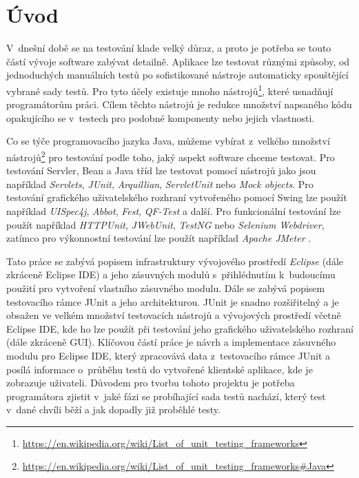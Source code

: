\chapter{Úvod}                                                            %
V~dnešní době se na testování klade velký důraz, a proto je potřeba se touto částí vývoje software zabývat detailně. Aplikace lze testovat různými způsoby, od jednoduchých manuálních testů po sofistikované nástroje automaticky spouštějící vybrané sady testů. Pro tyto účely existuje mnoho nástrojů\footnote{\url{https://en.wikipedia.org/wiki/List_of_unit_testing_frameworks}}, které usnadňují programátorům práci. Cílem těchto nástrojů je redukce množství napsaného kódu opakujícího se v~testech pro podobné komponenty nebo jejich vlastnosti.

Co se týče programovacího jazyka Java, můžeme vybírat z~velkého množství nástrojů\footnote{\url{https://en.wikipedia.org/wiki/List_of_unit_testing_frameworks\#Java}} pro testování podle toho, jaký aspekt software chceme testovat. Pro testování Servler, Bean a Java tříd lze testovat pomocí nástrojů jako jsou například \emph{Servlets}, \emph{JUnit}, \emph{Arquillian}, \emph{ServletUnit} nebo \emph{Mock objects}. Pro testování grafického uživatelského rozhraní vytvořeného pomocí Swing lze použít například \emph{UISpec4j}, \emph{Abbot}, \emph{Fest}, \emph{QF-Test} a další. Pro funkcionální testování lze použít například \emph{HTTPUnit}, \emph{JWebUnit}, \emph{TestNG} nebo \emph{Selenium Webdriver}, zatímco pro výkonnostní testování lze použít například \emph{Apache JMeter} \cite{softwaretestinghelp}.

Tato práce se zabývá popisem infrastruktury vývojového prostředí \emph{Eclipse} (dále zkráceně Eclipse IDE) a jeho zásuvných modulů s~přihlédnutím k~budoucímu použití pro vytvoření vlastního zásuvného modulu. Dále se zabývá popisem testovacího rámce JUnit a jeho architekturou. JUnit je snadno rozšiřitelný a je obsažen ve velkém množství testovacích nástrojů a vývojových prostředí včetně Eclipse IDE, kde ho lze použít při testování jeho grafického uživatelského rozhraní (dále zkráceně GUI). Klíčovou částí práce je návrh a implementace zásuvného modulu pro Eclipse IDE, který zpracovává data z~testovacího rámce JUnit a posílá informace o~průběhu testů do vytvořené klientské aplikace, kde je zobrazuje uživateli. Důvodem pro tvorbu tohoto projektu je potřeba programátora zjistit v~jaké fázi se probíhající sada testů nachází, který test v~dané chvíli běží a jak dopadly již proběhlé testy.

